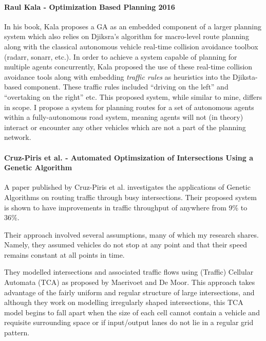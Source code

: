 \paragraph{Raul Kala - Optimization Based Planning 2016\cite{kalaOptimizationBasedPlanning2016}}
In his book, Kala proposes a GA as an embedded component of a larger planning system which also relies on Djiksra's algorithm for macro-level route planning along with the classical autonomous vehicle real-time collision avoidance toolbox (radarr, sonarr, etc.). In order to achieve a system capable of planning for multiple agents concurrently, Kala proposed the use of these real-time collision avoidance tools along with embedding \textit{traffic rules} as heuristics into the Djiksta-based component. These traffic rules included ``driving on the left'' and ``overtaking on the right'' etc. This proposed system, while similar to mine, differs in scope. I propose a system for planning routes for a set of autonomous agents within a fully-autonomous road system, meaning agents will not (in theory) interact or encounter any other vehicles which are not a part of the planning network.

\paragraph{Cruz-Piris et al. - Automated Optimsization of Intersections Using a Genetic Algorithm\cite{cruz-pirisAutomatedOptimizationIntersections2019}}
A paper published by Cruz-Piris et al. investigates the applications of Genetic Algorithms on routing traffic through busy intersections. Their proposed system is shown to have improvements in traffic throughput of anywhere from 9\% to 36\%.

Their approach involved several assumptions, many of which my research shares. Namely, they assumed vehicles do not stop at any point and that their speed remains constant at all points in time.

They modelled intersections and associated traffic flows using (Traffic) Cellular Automata (TCA) as proposed by Maerivoet and De Moor\cite{maerivoetCellularAutomataModels2005}. This approach takes advantage of the fairly uniform and regular structure of large intersections, and although they work on modelling irregularly shaped intersections, this TCA model begins to fall apart when the size of each cell cannot contain a vehicle and requisite surrounding space or if input/output lanes do not lie in a regular grid pattern.


